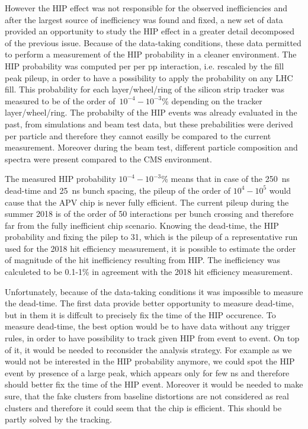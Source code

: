 
However the HIP effect was not responsible for the observed inefficiencies and after the largest source of inefficiency was found and fixed, a new set of data provided an opportunity to study the HIP effect in a greater detail decomposed of the previous issue. Because of the data-taking conditions, these data permitted to perform a  measurement of the HIP probability in a cleaner environment. The HIP probability was computed per per pp interaction, i.e. rescaled by the fill peak pileup, in order to have a possibility to apply the probability on any LHC fill. This probability for each layer/wheel/ring of the silicon strip tracker was measured to be of the order of~$10^{-4}-10^{-3}$\% depending on the tracker layer/wheel/ring. The probabilty of the HIP events was already evaluated in the past, from simulations and beam test data, but these prebabilities were derived per particle and therefore they cannot easilly be compared to the current measurement. Moreover during the beam test, different particle composition and spectra were present compared to the CMS environment.

The measured HIP probability  $10^{-4}-10^{-3}$\% means that in case of the 250~ns dead-time and 25~ns bunch spacing, the pileup of the order of $10^4-10^5$ would cause that the APV chip is never fully efficient. The current pileup during the summer 2018 is of the order of 50 interactions per bunch crossing and therefore far from the fully inefficient chip scenario. Knowing the dead-time, the HIP probability and fixing the pilep to 31, which is the pileup of a representative run used for the 2018 hit efficiency measurement, it is possible to estimate the order of magnitude of the hit inefficiency resulting from HIP. The inefficiency was calculeted to be 0.1-1\% in agreement with the 2018 hit efficiency measurement.


Unfortunately, because of the data-taking conditions it was impossible to measure the dead-time. The first data provide better opportunity to measure dead-time, but in them it is diffcult to precisely fix the time of the HIP occurence. To measure dead-time, the best option would be to have data without any trigger rules, in order to have possibility to track given HIP from event to event. On top of it, it would be needed to reconsider the analysis strategy. For example as we would not be interested in the HIP probability anymore, we could spot the HIP event by presence of a large peak, which appears only for few ns and therefore should better fix the time of the HIP event. Moreover it would be needed to make sure, that the fake clusters from baseline distortions are not considered as real clusters and therefore it could seem that the chip is efficient. This should be partly solved by the tracking. 

